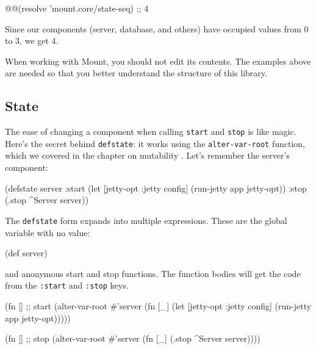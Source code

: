 \begin{english}
  \begin{clojure}
@@(resolve 'mount.core/state-seq) ;; 4
  \end{clojure}
\end{english}

\noindent
Since our components (server, database, and others) have occupied values from 0 to 3, we get 4.

When working with Mount, you should not edit its contents. The examples above are needed so that you better understand the structure of this library.

\subsection{State}


The ease of changing a component when calling \verb|start| and \verb|stop| is like magic. Here's the secret behind \verb|defstate|: it works using the \verb|alter-var-root| function, which we covered in the chapter on mutability . Let's remember the server's component:

\begin{english}
  \begin{clojure}
(defstate server
  :start
  (let [{jetty-opt :jetty} config]
    (run-jetty app jetty-opt))
  :stop
  (.stop ^Server server))
  \end{clojure}
\end{english}

The \verb|defstate| form expands  into multiple expressions. These are the global variable with no value:


\begin{english}
  \begin{clojure}
(def server)
  \end{clojure}
\end{english}

\noindent
and anonymous start and stop functions. The function bodies will get the code from the \verb|:start| and \verb|:stop| keys.

\begin{english}
  \begin{clojure}
(fn [] ;; start
  (alter-var-root #'server
   (fn [_]
     (let [{jetty-opt :jetty} config]
       (run-jetty app jetty-opt)))))

(fn [] ;; stop
  (alter-var-root #'server
   (fn [_]
     (.stop ^Server server))))
  \end{clojure}
\end{english}

